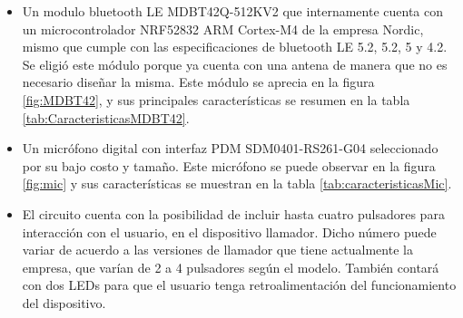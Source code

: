 \begin{itemize}

\item Un modulo bluetooth LE MDBT42Q-512KV2 que internamente cuenta con un microcontrolador NRF52832 ARM Cortex-M4 de la empresa Nordic, mismo que cumple con las especificaciones de bluetooth LE 5.2, 5.2, 5 y 4.2. Se eligió este módulo porque ya cuenta con una antena de manera que no es necesario diseñar la misma. Este módulo se aprecia en la figura \ref{fig:MDBT42}, y sus principales características se resumen en la tabla \ref{tab:CaracteristicasMDBT42}.

\item Un micrófono digital con interfaz PDM SDM0401-RS261-G04 seleccionado por su bajo costo y tamaño. Este micrófono se puede observar en la figura \ref{fig:mic} y sus características se muestran en la tabla \ref{tab:caracteristicasMic}.

\item El circuito cuenta con la posibilidad de incluir hasta cuatro pulsadores para interacción con el usuario, en el dispositivo llamador. Dicho número puede variar de acuerdo a las versiones de llamador que tiene actualmente la empresa, que varían de 2 a 4 pulsadores según el modelo. También contará con dos LEDs para que el usuario tenga retroalimentación del funcionamiento del dispositivo.

\end{itemize}

